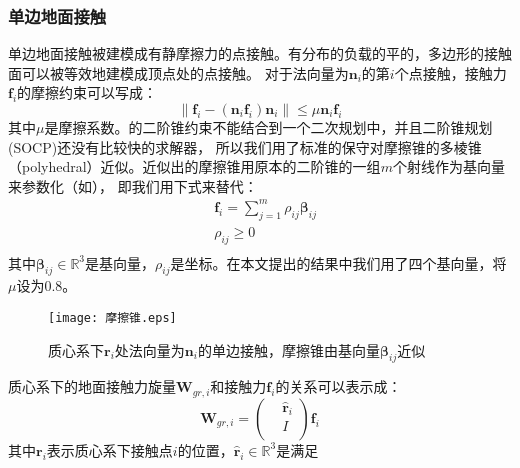 \subsubsection{单边地面接触}
单边地面接触被建模成有静摩擦力的点接触。有分布的负载的平的，多边形的接触面可以被等效地建模成顶点处的点接触。
对于法向量为${{\boldsymbol{n}}_{i}}$的第$i$个点接触，接触力${{\boldsymbol{f}}_{i}}$的摩擦约束可以写成：
\begin{equation}
    \label{equ:friction_cone}
    \left\| {{\boldsymbol{f}}_{i}}-({{\boldsymbol{n}}_{i}}{{\boldsymbol{f}}_{i}}){{\boldsymbol{n}}_{i}} \right\|\le \mu {{\boldsymbol{n}}_{i}}{{\boldsymbol{f}}_{i}}
\end{equation}
其中$\mu$是摩擦系数。的二阶锥约束不能结合到一个二次规划中，并且二阶锥规划(SOCP)还没有比较快的求解器，
所以我们用了标准的保守对摩擦锥的多棱锥（polyhedral）近似。近似出的摩擦锥用原本的二阶锥的一组$m$个射线作为基向量来参数化（如），
即我们用下式来替代：
\begin{equation}
    \label{equ:friction_para}
    \begin{aligned}
        & {{\boldsymbol{f}}_{i}}=\sum\limits_{j=1}^{m}{{{\rho }_{ij}}{{\boldsymbol{\beta}}_{ij}}} \\ 
       & {{\rho }_{ij}}\ge 0 \\ 
      \end{aligned}      
\end{equation}
其中$\boldsymbol{\beta}_{ij} \in \mathbb{R}^3$是基向量，$\rho_{ij}$是坐标。在本文提出的结果中我们用了四个基向量，将$\mu$设为0.8。
\begin{figure}[htbp]
    \centering
    \texttt{[image: 摩擦锥.eps]}
    \caption{\label{fig:friction_cone}质心系下$\boldsymbol{r}_{i}$处法向量为${{\boldsymbol{n}}_{i}}$的单边接触，摩擦锥由基向量$\boldsymbol{\beta}_{ij}$近似}
\end{figure}
质心系下的地面接触力旋量${{\boldsymbol{W}}_{gr,i}}$和接触力${{\boldsymbol{f}}_{i}}$的关系可以表示成：
\begin{equation}
    \label{equ:contact_wrench}
    {\boldsymbol{W}_{gr,i}}=\left( \begin{aligned}
        & {{{\hat{\boldsymbol{r}}}}_{i}} \\ 
       & I \\ 
      \end{aligned} \right){\boldsymbol{f}_{i}}      
\end{equation}
其中${\boldsymbol{r}_{i}}$表示质心系下接触点$i$的位置，${{\hat{\boldsymbol{r}}}_{i}}\in {{\mathbb{R}}^{3}}$是满足
